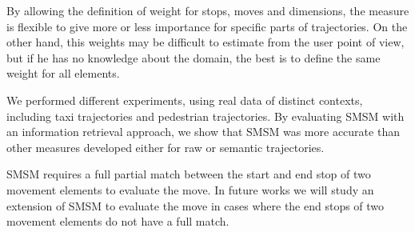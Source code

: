 \documentclass[12pt]{article}
\begin{document}
By allowing the definition of weight for stops, moves and dimensions, the measure is flexible to give more or less importance for specific parts of trajectories. On the other hand, this weights may be difficult to estimate from the user point of view, but if he has no knowledge about the domain, the best is to define the same weight for all elements.

We performed different experiments, using real data of distinct contexts, including taxi trajectories and pedestrian trajectories. By evaluating SMSM with an information retrieval approach, we show that SMSM was more accurate than other measures developed either for raw or semantic trajectories.

SMSM requires a full partial match between the start and end stop of two movement elements to evaluate the move. In future works we will study an extension of SMSM to evaluate the move in cases where the end stops of two movement elements do not have a full match.



\end{document}
